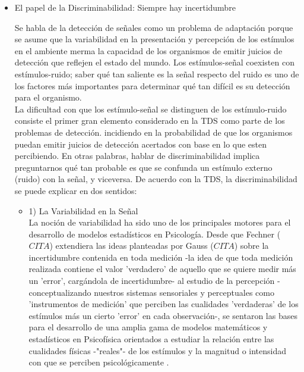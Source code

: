 \begin{itemize}
  \item{El papel de la Discriminabilidad: Siempre hay incertidumbre}

Se habla de la detección de señales como un problema de adaptación porque se asume que la variabilidad en la presentación y percepción de los estímulos en el ambiente merma la capacidad de los organismos de emitir juicios de detección que reflejen el estado del mundo. Los estímulos-señal coexisten con estímulos-ruido; saber qué tan saliente es la señal respecto del ruido es uno de los factores más importantes para determinar qué tan difícil es su detección para el organismo.\\

La dificultad con que los estímulo-señal se distinguen de los estímulo-ruido consiste el primer gran elemento considerado en la TDS como parte de los problemas de detección. incidiendo en la probabilidad de que los organismos puedan emitir juicios de detección acertados con base en lo que esten percibiendo. En otras palabras, hablar de discriminabilidad implica preguntarnos qué tan probable es que se confunda un estímulo externo (ruido) con la señal, y viceversa. De acuerdo con la TDS, la discriminabilidad se puede explicar en dos sentidos:\\ %

    \begin{itemize}
      \item{1) La Variabilidad en la Señal}\\

La noción de variabilidad ha sido uno de los principales motores para el desarrollo de modelos estadísticos en Psicología. Desde que Fechner ($CITA$) extendiera las ideas planteadas por Gauss ($CITA$) sobre la incertidumbre contenida en toda medición -la idea de que toda medición realizada contiene el valor 'verdadero' de aquello que se quiere medir más un 'error', cargándola de incertidumbre- al estudio de la percepción -conceptualizando nuestros sistemas sensoriales y perceptuales como 'instrumentos de medición' que perciben las cualidades 'verdaderas' de los estímulos más un cierto 'error' en cada observación-, se sentaron las bases para el desarrollo de una amplia gama de modelos matemáticos y estadísticos en Psicofísica orientados a estudiar la relación entre las cualidades físicas -"reales"- de los estímulos y la magnitud o intensidad con que se perciben psicológicamente \parencite{Link1994}.\\



\end{itemize}
\end{itemize}
